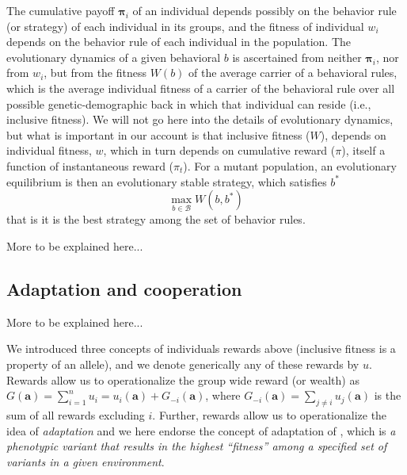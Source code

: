 \documentclass[12pt]{article}
\newcommand{\pa}{\pi}
\newcommand{\br}{b}
\newcommand{\Z}{\mathcal{B}}
\newcommand{\zm}{b}
\newcommand{\ut}{u}
\begin{document}
The cumulative payoff $\boldsymbol{\pa}_{i}$ of an individual depends possibly on the behavior rule (or strategy) of each individual in its groups, and the fitness of individual $w_i$ depends on the behavior rule of each individual in the population. The evolutionary dynamics of a given behavioral $\br$ is ascertained from neither $\boldsymbol{\pa}_{i}$, nor from $w_i$, but from the fitness $W(\br)$ of the average carrier of a behavioral rules, which is the average individual fitness of a carrier of the behavioral rule over all possible genetic-demographic back in which that individual can reside (i.e., inclusive fitness). We will not go here into the details of evolutionary dynamics, but what is important in our account is that inclusive fitness ($W$), depends on individual fitness, $w$, which in turn depends on cumulative reward ($\pa$), itself a function of instantaneous reward ($\pa_t$). For a mutant population, an evolutionary equilibrium is then an evolutionary stable strategy, which satisfies $\br^\ast$
\begin{equation}
\max_{\zm \in \Z }W(\zm ,\br^\ast)
\label{UnInvadCond}
\end{equation}
that is it is the best strategy among the set of behavior rules.

More to be explained here...


\subsection*{Adaptation and cooperation}


More to be explained here...

We introduced three concepts of individuals rewards above (inclusive fitness is a property of an allele), and we denote generically any of these rewards by $\ut$. Rewards allow us to operationalize the group wide reward (or wealth) as $G(\mathbf{a})=\sum^n_{i=1}u_i=u_i(\mathbf{a})+G_{-i}(\mathbf{a})$, where $G_{-i}(\mathbf{a})=\sum_{j \neq i}u_j(\mathbf{a})$ is the sum of all rewards excluding $i$. Further, rewards allow us to operationalize the idea of \textit{adaptation} and we here endorse the concept of adaptation of \citet{ReeveS93}, which is \textit{a phenotypic variant that results in the highest ``fitness'' among a specified set of variants in a given environment}. 
\end{document}
